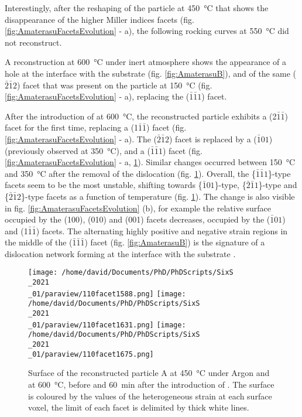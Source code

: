 Interestingly, after the reshaping of the particle at \qty{450}{\degreeCelsius} that shows the disappearance of the higher Miller indices facets (fig. \ref{fig:AmaterasuFacetsEvolution} - a), the following rocking curves at \qty{550}{\degreeCelsius} did not reconstruct.

A reconstruction at \qty{600}{\degreeCelsius} under inert atmosphere shows the appearance of a hole at the interface with the substrate (fig. \ref{fig:AmaterasuB}), and of the same ($\bar{2}\bar{1}2$) facet that was present on the particle at \qty{150}{\degreeCelsius} (fig. \ref{fig:AmaterasuFacetsEvolution} - a), replacing the ($\bar{1}\bar{1}1$) facet.

After the introduction of  at \qty{600}{\degreeCelsius}, the reconstructed particle exhibits a (2$\bar{1}\bar{1}$) facet for the first time, replacing a (1$\bar{1}\bar{1}$) facet (fig. \ref{fig:AmaterasuFacetsEvolution} - a).
The ($\bar{2}\bar{1}2$) facet is replaced by a ($\bar{1}01$) (previously observed at \qty{350}{\degreeCelsius}), and a ($\bar{1}\bar{1}1$) facet (fig. \ref{fig:AmaterasuFacetsEvolution} - a, \ref{fig:Amaterasu110}).
Similar changes occurred between \qty{150}{\degreeCelsius} and \qty{350}{\degreeCelsius} after the removal of the dislocation (fig. \ref{fig:Amaterasu110}).
Overall, the \{$\bar{1}\bar{1}1$\}-type facets seem to be the most unstable, shifting towards \{$\bar{1}01$\}-type, \{$\bar{2}\bar{1}1$\}-type and \{$\bar{2}\bar{1}2$\}-type facets as a function of temperature (fig. \ref{fig:Amaterasu110}).
The change is also visible in fig. \ref{fig:AmaterasuFacetsEvolution} (b), for example the relative surface occupied by the (100), (010) and (001) facets decreases, occupied by the ($\bar{1}01$) and (1$\bar{1}\bar{1}$) facets.
The alternating highly positive and negative strain regions in the middle of the ($\bar{1}\bar{1}\bar{1}$) facet (fig. \ref{fig:AmaterasuB}) is the signature of a dislocation network forming at the interface with the substrate \parencite{Dupraz2015}.

\begin{figure}[!htb]
    \centering
    \texttt{[image: /home/david/Documents/PhD/PhDScripts/SixS\\\_2021\\\_01/paraview/110facet1588.png]}
    \texttt{[image: /home/david/Documents/PhD/PhDScripts/SixS\\\_2021\\\_01/paraview/110facet1631.png]}
    \texttt{[image: /home/david/Documents/PhD/PhDScripts/SixS\\\_2021\\\_01/paraview/110facet1675.png]}
    \caption{
        Surface of the reconstructed particle A at \qty{450}{\degreeCelsius} under Argon and at \qty{600}{\degreeCelsius}, before and \qty{60}{\minute} after the introduction of .
        The surface is coloured by the values of the heterogeneous strain at each surface voxel, the limit of each facet is delimited by thick white lines.
    }
    \label{fig:Amaterasu110}
\end{figure}

